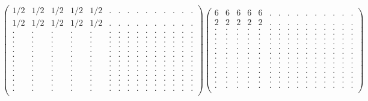 \documentclass[12pt,a4paper]{amsart}
\begin{document}
\begin{align*}
\left(\begin{array}{rrrrrrrrrrrrrrr}%
1/2&1/2&1/2&1/2&1/2&.&.&.&.&.&.&.&.&.&.\\%
1/2&1/2&1/2&1/2&1/2&.&.&.&.&.&.&.&.&.&.\\%
.&.&.&.&.&.&.&.&.&.&.&.&.&.&.\\%
.&.&.&.&.&.&.&.&.&.&.&.&.&.&.\\%
.&.&.&.&.&.&.&.&.&.&.&.&.&.&.\\%
.&.&.&.&.&.&.&.&.&.&.&.&.&.&.\\%
.&.&.&.&.&.&.&.&.&.&.&.&.&.&.\\%
.&.&.&.&.&.&.&.&.&.&.&.&.&.&.\\%
.&.&.&.&.&.&.&.&.&.&.&.&.&.&.\\%
.&.&.&.&.&.&.&.&.&.&.&.&.&.&.\\%
.&.&.&.&.&.&.&.&.&.&.&.&.&.&.\\%
.&.&.&.&.&.&.&.&.&.&.&.&.&.&.\\%
.&.&.&.&.&.&.&.&.&.&.&.&.&.&.\\%
.&.&.&.&.&.&.&.&.&.&.&.&.&.&.\\%
.&.&.&.&.&.&.&.&.&.&.&.&.&.&.\\%
\end{array}\right)%
\left(\begin{array}{rrrrrrrrrrrrrrr}%
6&6&6&6&6&.&.&.&.&.&.&.&.&.&.\\%
2&2&2&2&2&.&.&.&.&.&.&.&.&.&.\\%
.&.&.&.&.&.&.&.&.&.&.&.&.&.&.\\%
.&.&.&.&.&.&.&.&.&.&.&.&.&.&.\\%
.&.&.&.&.&.&.&.&.&.&.&.&.&.&.\\%
.&.&.&.&.&.&.&.&.&.&.&.&.&.&.\\%
.&.&.&.&.&.&.&.&.&.&.&.&.&.&.\\%
.&.&.&.&.&.&.&.&.&.&.&.&.&.&.\\%
.&.&.&.&.&.&.&.&.&.&.&.&.&.&.\\%
.&.&.&.&.&.&.&.&.&.&.&.&.&.&.\\%
.&.&.&.&.&.&.&.&.&.&.&.&.&.&.\\%
.&.&.&.&.&.&.&.&.&.&.&.&.&.&.\\%
.&.&.&.&.&.&.&.&.&.&.&.&.&.&.\\%
.&.&.&.&.&.&.&.&.&.&.&.&.&.&.\\%
.&.&.&.&.&.&.&.&.&.&.&.&.&.&.\\%
\end{array}\right)%
\end{align*}
\end{document}
